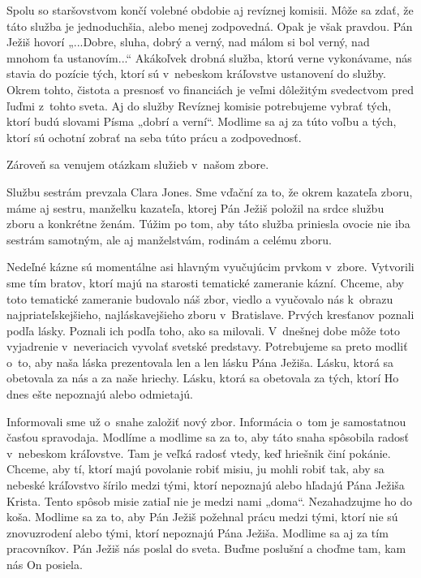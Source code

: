 Spolu so staršovstvom končí volebné obdobie aj revíznej komisii. Môže sa zdať, že táto služba je jednoduchšia, alebo menej zodpovedná. Opak je však pravdou. Pán Ježiš hovorí „...Dobre, sluha, dobrý a verný, nad málom si bol verný, nad mnohom ťa ustanovím...“ Akákoľvek drobná služba, ktorú verne vykonávame, nás stavia do pozície tých, ktorí sú v~nebeskom kráľovstve ustanovení do služby. Okrem tohto, čistota a presnosť vo financiách je veľmi dôležitým svedectvom pred ľuďmi z~tohto sveta. Aj do služby Revíznej komisie potrebujeme vybrať tých, ktorí budú slovami Písma „dobrí a verní“. Modlime sa aj za túto voľbu a tých, ktorí sú ochotní zobrať na seba túto prácu a zodpovednosť.

Zároveň sa venujem otázkam služieb v~našom zbore.

Službu sestrám prevzala Clara Jones. Sme vďační za to, že okrem kazateľa zboru, máme aj sestru, manželku kazateľa, ktorej Pán Ježiš položil na srdce službu zboru a konkrétne ženám. Túžim po tom, aby táto služba priniesla ovocie nie iba sestrám samotným, ale aj manželstvám, rodinám a celému zboru.

Nedeľné kázne sú momentálne asi hlavným vyučujúcim prvkom v~zbore. Vytvorili sme tím bratov, ktorí majú na starosti tematické zameranie kázní. Chceme, aby toto tematické zameranie budovalo náš zbor, viedlo a vyučovalo nás k~obrazu najpriateľskejšieho, najláskavejšieho zboru v~Bratislave. Prvých kresťanov poznali podľa lásky. Poznali ich podľa toho, ako sa milovali. V~dnešnej dobe môže toto vyjadrenie v~neveriacich vyvolať svetské predstavy. Potrebujeme sa preto modliť o~to, aby naša láska prezentovala len a len lásku Pána Ježiša. Lásku, ktorá sa obetovala za nás a za naše hriechy. Lásku, ktorá sa obetovala za tých, ktorí Ho dnes ešte nepoznajú alebo odmietajú.

Informovali sme už o~snahe založiť nový zbor. Informácia o~tom je samostatnou časťou spravodaja. Modlíme a modlime sa za to, aby táto snaha spôsobila radosť v~nebeskom kráľovstve. Tam je veľká radosť vtedy, keď hriešnik činí pokánie. Chceme, aby tí, ktorí majú povolanie robiť misiu, ju mohli robiť tak, aby sa nebeské kráľovstvo šírilo medzi tými, ktorí nepoznajú alebo hľadajú Pána Ježiša Krista. Tento spôsob misie zatiaľ nie je medzi nami „doma“. Nezahadzujme ho do koša. Modlime sa za to, aby Pán Ježiš požehnal prácu medzi tými, ktorí nie sú znovuzrodení alebo tými, ktorí nepoznajú Pána Ježiša. Modlime sa aj za tím pracovníkov. Pán Ježiš nás poslal do sveta. Buďme poslušní a choďme tam, kam nás On posiela.

